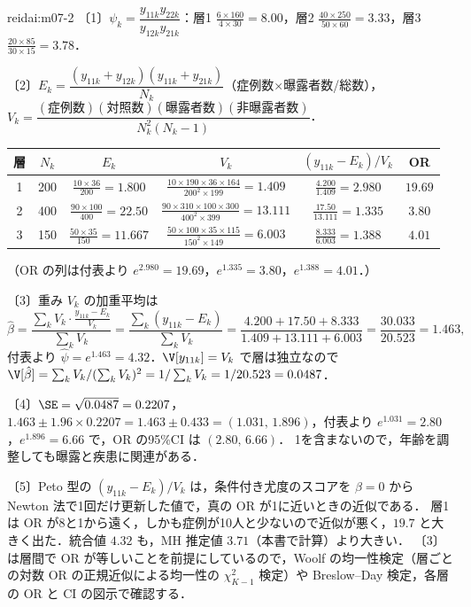 \begin{kaitou}{reidai:m07-2}
〔1〕$\psi_k=\dfrac{y_{11k}y_{22k}}{y_{12k}y_{21k}}$：層1 $\frac{6\times160}{4\times30}=8.00$，層2 $\frac{40\times250}{50\times60}=3.33$，層3 $\frac{20\times85}{30\times15}=3.78$．

〔2〕$E_k=\dfrac{(y_{11k}+y_{12k})(y_{11k}+y_{21k})}{N_k}$（症例数×曝露者数/総数），$V_k=\dfrac{(\text{症例数})(\text{対照数})(\text{曝露者数})(\text{非曝露者数})}{N_k^2(N_k-1)}$．
\begin{center}\small
\begin{tabular}{@{}cccccc@{}}
\toprule
層 & $N_k$ & $E_k$ & $V_k$ & $(y_{11k}-E_k)/V_k$ & OR\\
\midrule
1 & 200 & $\frac{10\times36}{200}=1.800$ & $\frac{10\times190\times36\times164}{200^2\times199}=1.409$ & $\frac{4.200}{1.409}=2.980$ & $19.69$\\
2 & 400 & $\frac{90\times100}{400}=22.50$ & $\frac{90\times310\times100\times300}{400^2\times399}=13.111$ & $\frac{17.50}{13.111}=1.335$ & $3.80$\\
3 & 150 & $\frac{50\times35}{150}=11.667$ & $\frac{50\times100\times35\times115}{150^2\times149}=6.003$ & $\frac{8.333}{6.003}=1.388$ & $4.01$\\
\bottomrule
\end{tabular}
\end{center}
（OR の列は付表より $e^{2.980}=19.69$，$e^{1.335}=3.80$，$e^{1.388}=4.01$．）

〔3〕重み $V_k$ の加重平均は
\[
\hat\beta=\frac{\sum_kV_k\cdot\frac{y_{11k}-E_k}{V_k}}{\sum_kV_k}=\frac{\sum_k(y_{11k}-E_k)}{\sum_kV_k}=\frac{4.200+17.50+8.333}{1.409+13.111+6.003}=\frac{30.033}{20.523}=1.463,
\]
付表より $\hat\psi=e^{1.463}=4.32$．$\V[y_{11k}]=V_k$ で層は独立なので $\V[\hat\beta]=\sum_kV_k/(\sum_kV_k)^2=1/\sum_kV_k=1/20.523=0.0487$．

〔4〕$\SE=\sqrt{0.0487}=0.2207$，$1.463\pm1.96\times0.2207=1.463\pm0.433=(1.031,\,1.896)$，付表より $e^{1.031}=2.80$，$e^{1.896}=6.66$ で，OR の95\%CI は $(2.80,\,6.66)$．
1を含まないので，年齢を調整しても曝露と疾患に関連がある．

〔5〕Peto 型の $(y_{11k}-E_k)/V_k$ は，条件付き尤度のスコアを $\beta=0$ から Newton 法で1回だけ更新した値で，真の OR が1に近いときの近似である．
層1は OR が8と1から遠く，しかも症例が10人と少ないので近似が悪く，$19.7$ と大きく出た．統合値 $4.32$ も，MH 推定値 $3.71$（本書で計算）より大きい．
〔3〕は層間で OR が等しいことを前提にしているので，Woolf の均一性検定（層ごとの対数 OR の正規近似による均一性の $\chi^2_{K-1}$ 検定）や Breslow--Day 検定，各層の OR と CI の図示で確認する．
\end{kaitou}

